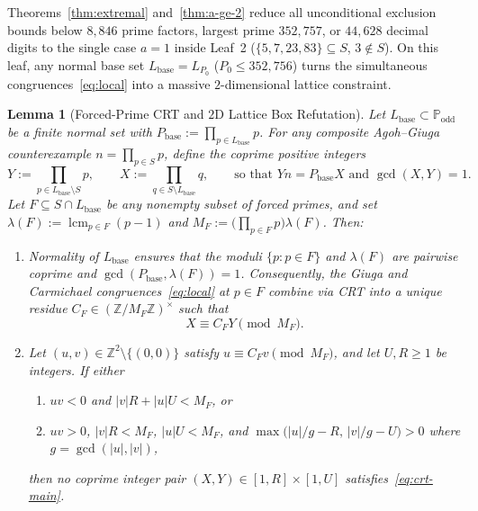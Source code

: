 \documentclass[11pt]{article}
\newtheorem{lemma}[theorem]{Lemma}
\theoremstyle{remark}
\newcommand{\Podd}{\mathbb{P}_{\mathrm{odd}}}
\begin{document}
Theorems~\ref{thm:extremal} and~\ref{thm:a-ge-2} reduce all unconditional
exclusion bounds below $8{,}846$ prime factors, largest prime $352{,}757$, or
$44{,}628$ decimal digits to the single case $a = 1$ inside Leaf~2
($\{5,7,23,83\}\subseteq S$, $3\notin S$). On this leaf, any normal base set
$L_{\mathrm{base}} = L_{P_0}$ ($P_0 \le 352{,}756$) turns the simultaneous
congruences~\eqref{eq:local} into a massive $2$-dimensional lattice constraint.

\begin{lemma}[Forced-Prime CRT and $2$D Lattice Box Refutation]\label{lem:crt-lattice}
Let $L_{\mathrm{base}} \subset \Podd$ be a finite normal set with
$P_{\mathrm{base}} := \prod_{p\in L_{\mathrm{base}}} p$. For any composite
Agoh--Giuga counterexample $n = \prod_{p\in S} p$, define the coprime positive
integers
\[
  Y := \prod_{p \in L_{\mathrm{base}} \setminus S} p,
  \qquad
  X := \prod_{q \in S \setminus L_{\mathrm{base}}} q,
  \qquad
  \text{so that } Y n = P_{\mathrm{base}} X \text{ and } \gcd(X, Y) = 1.
\]
Let $F \subseteq S \cap L_{\mathrm{base}}$ be any nonempty subset of forced
primes, and set $\lambda(F) := \operatorname{lcm}_{p\in F}(p - 1)$ and
$M_F := \bigl(\prod_{p\in F} p\bigr)\lambda(F)$. Then:
\begin{enumerate}
  \item Normality of $L_{\mathrm{base}}$ ensures that the moduli $\{p : p\in F\}$
  and $\lambda(F)$ are pairwise coprime and $\gcd(P_{\mathrm{base}}, \lambda(F)) = 1$.
  Consequently, the Giuga and Carmichael congruences~\eqref{eq:local} at $p\in F$
  combine via CRT into a unique residue $C_F \in (\mathbb{Z}/M_F\mathbb{Z})^\times$
  such that
  \begin{equation}\label{eq:crt-main}
    X \equiv C_F Y \pmod{M_F}.
  \end{equation}
  \item Let $(u, v) \in \mathbb{Z}^2 \setminus \{(0,0)\}$ satisfy
  $u \equiv C_F v \pmod{M_F}$, and let $U, R \ge 1$ be integers. If either
  \begin{enumerate}
    \item[(a)] $uv < 0$ and $|v|R + |u|U < M_F$, or
    \item[(b)] $uv > 0$, $|v|R < M_F$, $|u|U < M_F$, and
    $\max\bigl(|u|/g - R,\, |v|/g - U\bigr) > 0$ where $g = \gcd(|u|, |v|)$,
  \end{enumerate}
  then no coprime integer pair $(X, Y) \in [1, R] \times [1, U]$ satisfies~\eqref{eq:crt-main}.
\end{enumerate}
\end{lemma}
\end{document}

